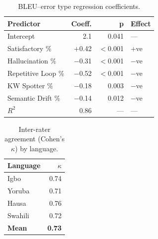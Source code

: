 
\begin{table}[t]
\centering
\small
\caption{BLEU--error type regression coefficients.}
\label{tab:p4_regression}
\begin{tabular}{lrrl}
\toprule
\textbf{Predictor} & \textbf{Coeff.} & \textbf{p} & \textbf{Effect} \\
\midrule
Intercept       & 2.1  & 0.041 & — \\
Satisfactory \% & +0.42 & $<$0.001 & +ve \\
Hallucination \% & $-$0.31 & $<$0.001 & $-$ve \\
Repetitive Loop \% & $-$0.52 & $<$0.001 & $-$ve \\
KW Spotter \% & $-$0.18 & 0.003 & $-$ve \\
Semantic Drift \% & $-$0.14 & 0.012 & $-$ve \\
\midrule
$R^2$ & 0.86 & — & — \\
\bottomrule
\end{tabular}
\end{table}

\begin{table}[t]
\centering
\small
\caption{Inter-rater agreement (Cohen's $\kappa$) by language.}
\label{tab:p4_irr}
\begin{tabular}{lr}
\toprule
\textbf{Language} & $\kappa$ \\
\midrule
Igbo    & 0.74 \\
Yoruba  & 0.71 \\
Hausa   & 0.76 \\
Swahili & 0.72 \\
\textbf{Mean} & \textbf{0.73} \\
\bottomrule
\end{tabular}
\end{table}
